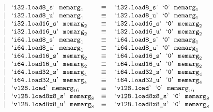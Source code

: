 $$\begin{array}[t]{@{}lrrl@{}l@{}l@{}l@{}}
& & | & \mbox{‘\texttt{i32.load8\_s}’}~~{{\mathtt{memarg}}}_{1} & \quad\equiv\quad{} & \mbox{‘\texttt{i32.load8\_s}’}~~\mbox{‘\texttt{0}’}~~{{\mathtt{memarg}}}_{1} \\
& & | & \mbox{‘\texttt{i32.load8\_u}’}~~{{\mathtt{memarg}}}_{1} & \quad\equiv\quad{} & \mbox{‘\texttt{i32.load8\_u}’}~~\mbox{‘\texttt{0}’}~~{{\mathtt{memarg}}}_{1} \\
& & | & \mbox{‘\texttt{i32.load16\_s}’}~~{{\mathtt{memarg}}}_{2} & \quad\equiv\quad{} & \mbox{‘\texttt{i32.load16\_s}’}~~\mbox{‘\texttt{0}’}~~{{\mathtt{memarg}}}_{2} \\
& & | & \mbox{‘\texttt{i32.load16\_u}’}~~{{\mathtt{memarg}}}_{2} & \quad\equiv\quad{} & \mbox{‘\texttt{i32.load16\_u}’}~~\mbox{‘\texttt{0}’}~~{{\mathtt{memarg}}}_{2} \\
& & | & \mbox{‘\texttt{i64.load8\_s}’}~~{{\mathtt{memarg}}}_{1} & \quad\equiv\quad{} & \mbox{‘\texttt{i64.load8\_s}’}~~\mbox{‘\texttt{0}’}~~{{\mathtt{memarg}}}_{1} \\
& & | & \mbox{‘\texttt{i64.load8\_u}’}~~{{\mathtt{memarg}}}_{1} & \quad\equiv\quad{} & \mbox{‘\texttt{i64.load8\_u}’}~~\mbox{‘\texttt{0}’}~~{{\mathtt{memarg}}}_{1} \\
& & | & \mbox{‘\texttt{i64.load16\_s}’}~~{{\mathtt{memarg}}}_{2} & \quad\equiv\quad{} & \mbox{‘\texttt{i64.load16\_s}’}~~\mbox{‘\texttt{0}’}~~{{\mathtt{memarg}}}_{2} \\
& & | & \mbox{‘\texttt{i64.load16\_u}’}~~{{\mathtt{memarg}}}_{2} & \quad\equiv\quad{} & \mbox{‘\texttt{i64.load16\_u}’}~~\mbox{‘\texttt{0}’}~~{{\mathtt{memarg}}}_{2} \\
& & | & \mbox{‘\texttt{i64.load32\_s}’}~~{{\mathtt{memarg}}}_{4} & \quad\equiv\quad{} & \mbox{‘\texttt{i64.load32\_s}’}~~\mbox{‘\texttt{0}’}~~{{\mathtt{memarg}}}_{4} \\
& & | & \mbox{‘\texttt{i64.load32\_u}’}~~{{\mathtt{memarg}}}_{4} & \quad\equiv\quad{} & \mbox{‘\texttt{i64.load32\_u}’}~~\mbox{‘\texttt{0}’}~~{{\mathtt{memarg}}}_{4} \\
& & | & \mbox{‘\texttt{v128.load}’}~~{{\mathtt{memarg}}}_{16} & \quad\equiv\quad{} & \mbox{‘\texttt{v128.load}’}~~\mbox{‘\texttt{0}’}~~{{\mathtt{memarg}}}_{16} \\
& & | & \mbox{‘\texttt{v128.load8x8\_s}’}~~{{\mathtt{memarg}}}_{8} & \quad\equiv\quad{} & \mbox{‘\texttt{v128.load8x8\_s}’}~~\mbox{‘\texttt{0}’}~~{{\mathtt{memarg}}}_{8} \\
& & | & \mbox{‘\texttt{v128.load8x8\_u}’}~~{{\mathtt{memarg}}}_{8} & \quad\equiv\quad{} & \mbox{‘\texttt{v128.load8x8\_u}’}~~\mbox{‘\texttt{0}’}~~{{\mathtt{memarg}}}_{8} \\

\end{array}$$
